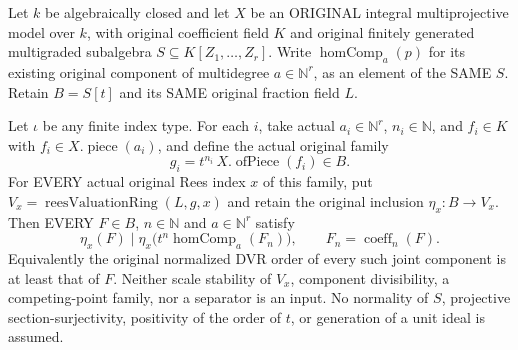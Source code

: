 \begin{theorem}
\label{algebra:actual-multigraded-rees-component-divisibility}
\leanok
{}
Let $k$ be algebraically closed and let $X$ be an ORIGINAL integral
multiprojective model over $k$, with original coefficient field $K$
and original finitely generated multigraded subalgebra
$S\subseteq K[Z_1,\ldots,Z_r]$.
Write $\operatorname{homComp}_a(p)$ for its existing original component
of multidegree $a\in\mathbb N^r$, as an element of the SAME $S$.
Retain $B=S[t]$ and its SAME original fraction field $L$.

Let $\iota$ be any finite index type. For each $i$, take actual
$a_i\in\mathbb N^r$, $n_i\in\mathbb N$, and $f_i\in K$ with
$f_i\in X.\operatorname{piece}(a_i)$, and define the actual original family
\[
 g_i=t^{n_i}\,X.\operatorname{ofPiece}(f_i)\in B.
\]
For EVERY actual original Rees index $x$ of this family, put
$V_x=\operatorname{reesValuationRing}(L,g,x)$ and retain the original
inclusion $\eta_x:B\to V_x$.
Then EVERY $F\in B$, $n\in\mathbb N$ and $a\in\mathbb N^r$ satisfy
\[
 \eta_x(F)\mid
 \eta_x\bigl(t^n\operatorname{homComp}_a(F_n)\bigr),
 \qquad F_n=\operatorname{coeff}_n(F).
 \tag{1}
\]
Equivalently the original normalized DVR order of every such joint
component is at least that of $F$. Neither scale stability of $V_x$,
component divisibility, a competing-point family, nor a separator is
an input. No normality of $S$, projective section-surjectivity,
positivity of the order of $t$, or generation of a unit ideal is assumed.
\end{theorem}
